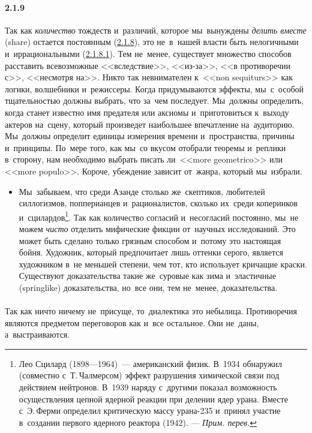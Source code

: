 \paragraph{2.1.9}\hypertarget{par:2.1.9}{} Так как {\itshape количество} тождеств и~различий, которое мы~вынуждены {\itshape делить вместе} (share) остается постоянным (\hyperlink{par:2.1.8}{2.1.8}), это не~в~нашей власти быть нелогичными и~иррациональными (\hyperlink{par:2.1.8.1}{2.1.8.1}). Тем не~менее, существует множество способов расставить всевозможные <<вследствие>>, <<из-за>>, <<в противоречии с>>, <<несмотря на>>. Никто так невнимателен к~<<non sequiturs>> как логики, волшебники и~режиссеры. Когда придумываются эффекты, мы~с~особой тщательностью должны выбрать, что за~чем последует. Мы~должны определить, когда станет известно имя предателя или аксиомы и~приготовиться к~выходу актеров на~сцену, который произведет наибольшее впечатление на~аудиторию. Мы~должны определит единицы измерения времени и~пространства, причины и~принципы. По~мере того, как мы~со вкусом отобрали теоремы и~реплики в~сторону, нам необходимо выбрать писать ли~<<more geometrico>> или <<more populo>>. Короче, убеждение зависит от~жанра, который мы~избрали.
	\begin{itemize}
	\item 
 Мы~забываем, что среди Азанде столько же~скептиков, любителей силлогизмов, попперианцев и~рационалистов, сколько их~среди коперинков и~сцилардов\footnote{Лео Сцилард (1898---1964)~--- американский физик. В~1934 обнаружил (совместно с~Т.\,Чалмерсом) эффект разрушения химической связи под действием нейтронов. В~1939 наряду с~другими показал возможность осуществления цепной ядерной реакции при делении ядер урана. Вместе с~Э.\,Ферми определил критическую массу урана-235 и~принял участие в~создании первого ядерного реактора (1942). --- {\itshape Прим. перев.}}. Так как количество согласий и~несогласий постоянно, мы~не можем {\itshape чисто} отделить мифические фикции от~научных исследований. Это может быть сделано только грязным способом и~потому это настоящая бойня. Художник, который предпочитает лишь оттенки серого, является художником в~не меньшей степени, чем тот, кто использует кричащие краски. Существуют доказательства такие же~суровые как зима и~эластичные (springlike) доказательства, но~все они, тем не~менее, доказательства.
	\end{itemize}

\paragraph{}\hypertarget{par:}{} Так как ничто ничему не~присуще, то~диалектика это небылица. Противоречия являются предметом переговоров как и~все остальное. Они не~даны, а~выстраиваются.

